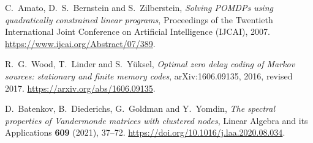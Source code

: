 C.~Amato, D.~S.~Bernstein and S.~Zilberstein,
\emph{Solving POMDPs using quadratically constrained linear programs},
Proceedings of the Twentieth International Joint Conference on
Artificial Intelligence (IJCAI), 2007.
\url{https://www.ijcai.org/Abstract/07/389}.

R.~G.~Wood, T.~Linder and S.~Y\"uksel,
\emph{Optimal zero delay coding of Markov sources: stationary and finite
memory codes}, arXiv:1606.09135, 2016, revised 2017.
\url{https://arxiv.org/abs/1606.09135}.

D.~Batenkov, B.~Diederichs, G.~Goldman and Y.~Yomdin,
\emph{The spectral properties of Vandermonde matrices with clustered
nodes}, Linear Algebra and its Applications \textbf{609} (2021), 37--72.
\url{https://doi.org/10.1016/j.laa.2020.08.034}.
